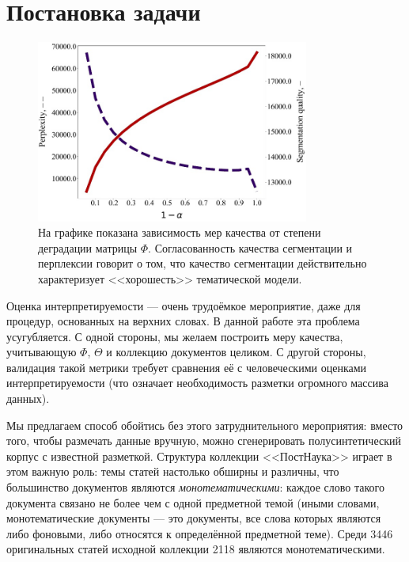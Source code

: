 \section{Постановка задачи}

\begin{figure}[h]
    \centering
    \includegraphics[width=0.8\textwidth]{images/segm_1.png}
    \caption{На графике показана зависимость мер качества от степени деградации матрицы $\Phi$. Согласованность качества сегментации и перплексии говорит о том, что качество сегментации действительно характеризует <<хорошесть>> тематической модели.}
    \label{plot:segm_quality-iteration}
\end{figure}

Оценка интерпретируемости --- очень трудоёмкое мероприятие, даже для процедур, основанных на верхних словах.
В данной работе эта проблема усугубляется. С одной стороны, мы желаем построить меру качества, учитывающую $\Phi$, $\Theta$ и коллекцию документов целиком. С другой стороны, валидация такой метрики требует сравнения её с человеческими оценками интерпретируемости (что означает необходимость разметки огромного массива данных).

Мы предлагаем способ обойтись без этого затруднительного мероприятия: вместо того, чтобы размечать данные вручную, можно сгенерировать полусинтетический корпус с известной разметкой. Структура коллекции <<ПостНаука>> играет в этом важную роль: темы статей настолько обширны и различны, что большинство документов являются \textit{монотематическими}: каждое слово такого документа связано не более чем с одной предметной темой (иными словами, монотематические документы --- это документы, все слова которых являются либо фоновыми, либо относятся к определённой предметной теме). Среди 3446 оригинальных статей исходной коллекции 2118 являются монотематическими.

